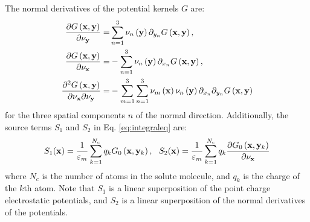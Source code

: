 \documentclass[11pt,titlepage]{article}
\begin{document}
%
The normal derivatives of the potential kernels $G$ are:
%
\begin{equation}
\begin{split}
\frac{\partial G\left({\bf x}, {\bf y}\right)}{\partial \nu_{\bf y}} =& \sum\limits_{n=1}^{3} \nu_n\left({\bf y}\right)\partial_{y_n}G\left({\bf x}, {\bf y}\right), \\
\frac{\partial G\left({\bf x}, {\bf y}\right)}{\partial \nu_{\bf x}} =& -\sum\limits_{n=1}^{3} \nu_n\left({\bf y}\right)\partial_{x_n}G\left({\bf x}, {\bf y}\right), \\
\frac{\partial^2 G\left({\bf x}, {\bf y}\right)}{\partial \nu_{\bf x}\partial \nu_{\bf y}} =& -\sum\limits_{m=1}^{3}\sum\limits_{n=1}^{3} \nu_m\left({\bf x}\right)\nu_n\left({\bf y}\right)\partial_{x_n}\partial_{y_n}G\left({\bf x}, {\bf y}\right) 
\end{split} \end{equation}
%
for the three spatial components $n$ of the normal direction. Additionally, the source terms $S_1$ and $S_2$ in Eq. \ref{eq:integraleq} are:
%
\begin{equation}
S_1({\bf x}) = \frac{1}{\varepsilon_m}\sum\limits_{k=1}^{N_c}q_k G_0\left({\bf x}, {\bf y}_k\right), \ \ S_2({\bf x}) = \frac{1}{\varepsilon_m}\sum\limits_{k=1}^{N_c}q_k \frac{\partial G_0\left({\bf x}, {\bf y}_k\right)}{\partial \nu_{\bf x}}
\end{equation}
%
where $N_c$ is the number of atoms in the solute molecule, and $q_k$ is the charge of the $k$th atom. Note that $S_1$ is a linear superposition of the point charge electrostatic potentials, and $S_2$ is a linear superposition of the normal derivatives of the potentials.
\end{document}
